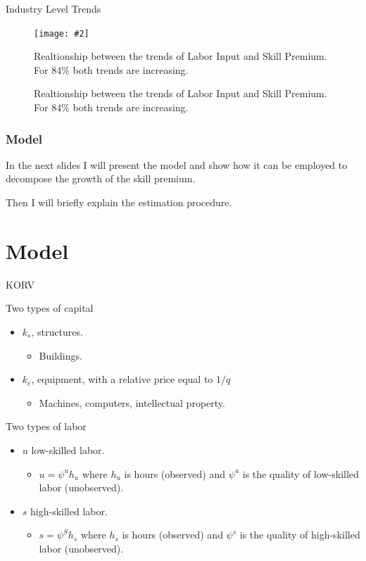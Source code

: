 \documentclass[notes,11pt, aspectratio=169]{beamer}
\makeatletter
\newcommand{\fitimage}[2][\@nil]{
 \begin{figure}
 \begin{adjustbox}{width=0.9\textwidth, totalheight=\textheight-2\baselineskip-2\baselineskip,keepaspectratio}
 \texttt{[image: \#2]}
 \end{adjustbox}
 \def\tmp{#1}%
 \ifx\tmp\@nnil
 \else
 \caption{#1}
 \fi
 \end{figure}
}
\newenvironment{wideitemize}{\itemize\addtolength{\itemsep}{10pt}}{\enditemize}
\makeatother
\begin{document}
\begin{frame}{Industry Level Trends \hyperlink{sp-model-decomposition}{}}\label{frame-industry-trends}

 \fitimage[Realtionship between the trends of Labor Input and Skill Premium. For $84\%$ both trends are increasing. ]{../images/trend_correlation_slides.pdf}

\end{frame}

\begin{frame}
 \frametitle{Model}

 \begin{wideitemize}
 \item In the next slides I will present the model and show how it can be employed to decompose the growth of the skill premium.
 \item Then I will briefly explain the estimation procedure.
 \end{wideitemize}

\end{frame}

\section{Model}
\begin{frame}{KORV}
 \begin{wideitemize}
 \item Two types of capital
 \begin{itemize}
 \item $k_s$, structures.
 \begin{itemize}
 \item Buildings.
 \end{itemize}
 \item $k_e$, equipment, with a relative price equal to $1/q$
 \begin{itemize}
 \item Machines, computers, intellectual property.
 \end{itemize}
 \end{itemize}
 \item Two types of labor
 \begin{itemize}
 \item $u$ low-skilled labor.
 \begin{itemize}
 \item $u= \psi^u h_u$ where $h_u$ is hours (observed) and $\psi^u$ is the quality of low-skilled labor (unobserved). 
 \end{itemize}
 \item $s$ high-skilled labor.
 \begin{itemize}
 \item $s = \psi^S h_s$ where $h_s$ is hours (observed) and $\psi^s$ is the quality of high-skilled labor (unobserved). 
 \end{itemize}
 \end{itemize}
\end{wideitemize}
\end{frame}
\end{document}
